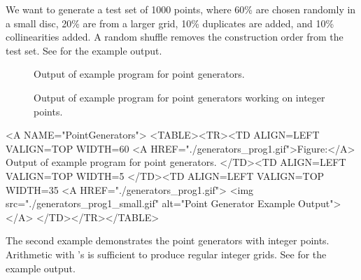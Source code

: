 \ccExample

We want to generate a test set of 1000 points, where 60\% are chosen
randomly in a small disc, 20\% are from a larger grid, 10\% duplicates
are added, and 10\% collinearities added. A random shuffle removes the
construction order from the test set. See  for the example output.


\begin{ccTexOnly}
  \begin{figure}
    \noindent
    \hspace*{0.025\textwidth}%
    \begin{minipage}{0.45\textwidth}%
      \caption{Output of example program for point generators.}
      \label{figurePointGenerator}
    \end{minipage}%
    \hspace*{0.05\textwidth}%
    \begin{minipage}{0.45\textwidth}%
      \caption{Output of example program for point generators working
        on integer points.}
      \label{figureIntegerPointGenerator}
    \end{minipage}%
  \end{figure}
\end{ccTexOnly}

\begin{ccHtmlOnly}
  <A NAME="PointGenerators">
  <TABLE><TR><TD ALIGN=LEFT VALIGN=TOP WIDTH=60%
    <A HREF="./generators_prog1.gif">Figure:</A>
    Output of example program for point generators.
  </TD><TD ALIGN=LEFT VALIGN=TOP WIDTH=5%
  </TD><TD ALIGN=LEFT VALIGN=TOP WIDTH=35%
    <A HREF="./generators_prog1.gif">
        <img src="./generators_prog1_small.gif" 
             alt="Point Generator Example Output"></A>
  </TD></TR></TABLE>
\end{ccHtmlOnly}


The second example demonstrates the point generators with integer
points. Arithmetic with 's is sufficient to produce
regular integer grids. See 
for the example output.

